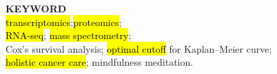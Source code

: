 \documentclass[
paper=landscape,
paper=160mm:90mm, %
fontsize=11pt, %
pagesize, %
parskip=half-, %
]{scrartcl} %
\theoremstyle{mythmstyle} %
\begin{document}
\clearpage


\thispagestyle{empty} %

\small\tableofcontents %


\textbf{KEYWORD}\\
\hl{transcriptomics};\hl{proteomics}; \\
\hl{RNA-seq}; \hl{mass spectrometry};\\
Cox's survival analysis; \hl{optimal cutoff} for Kaplan--Meier curve; \\
\hl{holistic cancer care}; mindfulness meditation.

\clearpage




\end{document}
